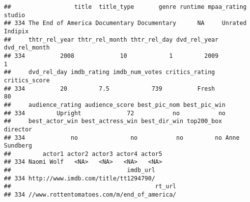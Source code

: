 \documentclass[]{article}
\begin{document}
\begin{verbatim}
##                  title  title_type       genre runtime mpaa_rating  studio
## 334 The End of America Documentary Documentary      NA     Unrated Indipix
##     thtr_rel_year thtr_rel_month thtr_rel_day dvd_rel_year dvd_rel_month
## 334          2008             10            1         2009             1
##     dvd_rel_day imdb_rating imdb_num_votes critics_rating critics_score
## 334          20         7.5            739          Fresh            80
##     audience_rating audience_score best_pic_nom best_pic_win
## 334         Upright             72           no           no
##     best_actor_win best_actress_win best_dir_win top200_box      director
## 334             no               no           no         no Anne Sundberg
##         actor1 actor2 actor3 actor4 actor5
## 334 Naomi Wolf   <NA>   <NA>   <NA>   <NA>
##                                 imdb_url
## 334 http://www.imdb.com/title/tt1294790/
##                                         rt_url
## 334 //www.rottentomatoes.com/m/end_of_america/
\end{verbatim}
\end{document}
